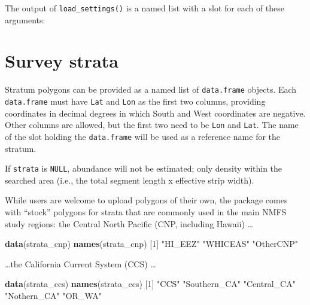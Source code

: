 \documentclass[
]{book}
\newenvironment{Shaded}{\begin{snugshade}}{\end{snugshade}}
\newcommand{\DecValTok}[1]{\textcolor[rgb]{0.00,0.00,0.81}{#1}}
\newcommand{\KeywordTok}[1]{\textcolor[rgb]{0.13,0.29,0.53}{\textbf{#1}}}
\newcommand{\NormalTok}[1]{#1}
\newcommand{\OperatorTok}[1]{\textcolor[rgb]{0.81,0.36,0.00}{\textbf{#1}}}
\newcommand{\StringTok}[1]{\textcolor[rgb]{0.31,0.60,0.02}{#1}}
\begin{document}
The output of \texttt{load\_settings()} is a named list with a slot for each of these arguments:

\begin{Shaded}
\end{Shaded}

\hypertarget{survey-strata}{%
\section*{Survey strata}\label{survey-strata}}

Stratum polygons can be provided as a named list of \texttt{data.frame} objects. Each \texttt{data.frame} must have \texttt{Lat} and \texttt{Lon} as the first two columns, providing coordinates in decimal degrees in which South and West coordinates are negative. Other columns are allowed, but the first two need to be \texttt{Lon} and \texttt{Lat}. The name of the slot holding the \texttt{data.frame} will be used as a reference name for the stratum.

If \texttt{strata} is \texttt{NULL}, abundance will not be estimated; only density within the searched area (i.e., the total segment length x effective strip width).

While users are welcome to upload polygons of their own, the package comes with ``stock'' polygons for strata that are commonly used in the main NMFS study regions: the Central North Pacific (CNP, including Hawaii) \ldots{}

\begin{Shaded}
\begin{Highlighting}[]
\KeywordTok{data}\NormalTok{(strata_cnp) }
\KeywordTok{names}\NormalTok{(strata_cnp)}
\NormalTok{[}\DecValTok{1}\NormalTok{] }\StringTok{"HI_EEZ"}   \StringTok{"WHICEAS"}  \StringTok{"OtherCNP"}
\end{Highlighting}
\end{Shaded}

\ldots the California Current System (CCS) \ldots{}

\begin{Shaded}
\begin{Highlighting}[]
\KeywordTok{data}\NormalTok{(strata_ccs) }
\KeywordTok{names}\NormalTok{(strata_ccs)}
\NormalTok{[}\DecValTok{1}\NormalTok{] }\StringTok{"CCS"}         \StringTok{"Southern_CA"} \StringTok{"Central_CA"}  \StringTok{"Nothern_CA"}  \StringTok{"OR_WA"}      
\end{Highlighting}
\end{Shaded}
\end{document}
